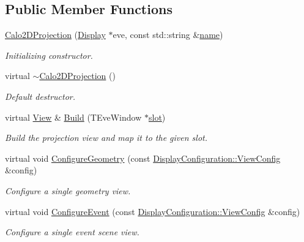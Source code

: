 \subsection*{Public Member Functions}
\begin{DoxyCompactItemize}
\item 
\hyperlink{class_d_d4hep_1_1_calo2_d_projection_a80436525b8087ffb14aa82b06b8059cb}{Calo2\+D\+Projection} (\hyperlink{class_d_d4hep_1_1_display}{Display} $\ast$eve, const std\+::string \&\hyperlink{class_d_d4hep_1_1_view_ae369eadf16399a6bf34f1ce491b7a788}{name})
\begin{DoxyCompactList}\small\item\em Initializing constructor. \end{DoxyCompactList}\item 
virtual \hyperlink{class_d_d4hep_1_1_calo2_d_projection_a955a146f1ac77e119979af591dd3fe71}{$\sim$\+Calo2\+D\+Projection} ()
\begin{DoxyCompactList}\small\item\em Default destructor. \end{DoxyCompactList}\item 
virtual \hyperlink{class_d_d4hep_1_1_view}{View} \& \hyperlink{class_d_d4hep_1_1_calo2_d_projection_a4ac47f2293dd1af3b2dc1b6311edb170}{Build} (T\+Eve\+Window $\ast$\hyperlink{_multi_view_8cpp_a402e7b855ac7bcf09e2ecf5e98220a11}{slot})
\begin{DoxyCompactList}\small\item\em Build the projection view and map it to the given slot. \end{DoxyCompactList}\item 
virtual void \hyperlink{class_d_d4hep_1_1_calo2_d_projection_aabf1a03b64b1baad596aaa9349e3cbea}{Configure\+Geometry} (const \hyperlink{class_d_d4hep_1_1_display_configuration_1_1_view_config}{Display\+Configuration\+::\+View\+Config} \&config)
\begin{DoxyCompactList}\small\item\em Configure a single geometry view. \end{DoxyCompactList}\item 
virtual void \hyperlink{class_d_d4hep_1_1_calo2_d_projection_ab49fa4071160750bd2c82e68b2f6d524}{Configure\+Event} (const \hyperlink{class_d_d4hep_1_1_display_configuration_1_1_view_config}{Display\+Configuration\+::\+View\+Config} \&config)
\begin{DoxyCompactList}\small\item\em Configure a single event scene view. \end{DoxyCompactList}\item 

\end{DoxyCompactItemize}
